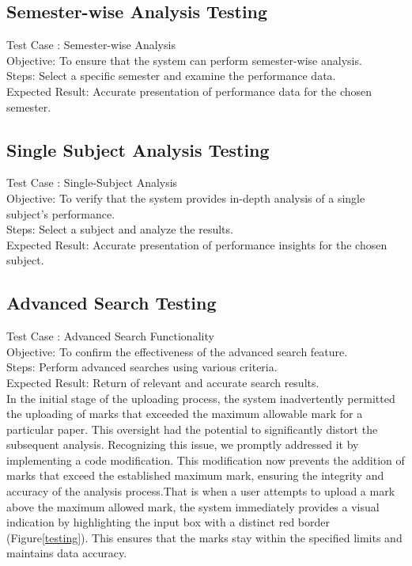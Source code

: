 \documentclass{nascproject}
\begin{document}
\subsection{Semester-wise Analysis Testing}
Test Case : Semester-wise Analysis\\
Objective: To ensure that the system can perform semester-wise analysis.\\
Steps: Select a specific semester and examine the performance data.\\
Expected Result: Accurate presentation of performance data for the chosen semester.
\subsection{Single Subject Analysis Testing}
Test Case : Single-Subject Analysis\\
Objective: To verify that the system provides in-depth analysis of a single subject's performance.\\
Steps: Select a subject and analyze the results.\\
Expected Result: Accurate presentation of performance insights for the chosen subject.
\subsection{ Advanced Search Testing}
Test Case : Advanced Search Functionality\\
Objective: To confirm the effectiveness of the advanced search feature.\\
Steps: Perform advanced searches using various criteria.\\
Expected Result: Return of relevant and accurate search results.\\

In the initial stage of the uploading process, the system inadvertently permitted the uploading of marks that exceeded the maximum allowable mark for a particular paper. This oversight had the potential to significantly distort the subsequent analysis. Recognizing this issue, we promptly addressed it by implementing a code modification. This modification now prevents the addition of marks that exceed the established maximum mark, ensuring the integrity and accuracy of the analysis process.That is when a user attempts to upload a mark above the maximum allowed mark, the system immediately provides a visual indication by highlighting the input box with a distinct red border (Figure\ref{testing}). This ensures that the marks stay within the specified limits and maintains data accuracy.
\end{document}
